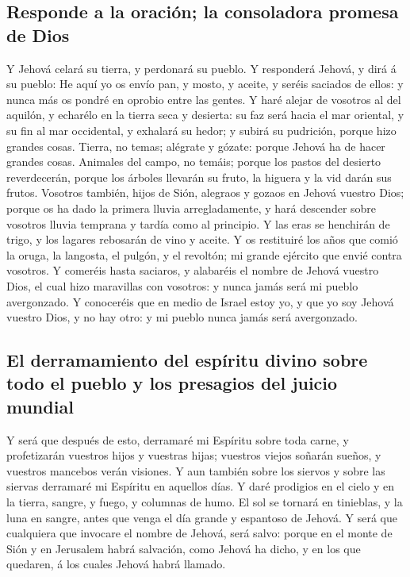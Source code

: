 \hypertarget{responde-a-la-oraciuxf3n-la-consoladora-promesa-de-dios}{%
\subsection{Responde a la oración; la consoladora promesa de
Dios}\label{responde-a-la-oraciuxf3n-la-consoladora-promesa-de-dios}}

 Y Jehová celará su tierra, y perdonará su pueblo.
 Y responderá Jehová, y dirá á su pueblo: He aquí yo os
envío pan, y mosto, y aceite, y seréis saciados de ellos: y nunca más os
pondré en oprobio entre las gentes.  Y haré alejar de
vosotros al del aquilón, y echarélo en la tierra seca y desierta: su faz
será hacia el mar oriental, y su fin al mar occidental, y exhalará su
hedor; y subirá su pudrición, porque hizo grandes cosas. 
Tierra, no temas; alégrate y gózate: porque Jehová ha de hacer grandes
cosas.  Animales del campo, no temáis; porque los pastos
del desierto reverdecerán, porque los árboles llevarán su fruto, la
higuera y la vid darán sus frutos.  Vosotros también,
hijos de Sión, alegraos y gozaos en Jehová vuestro Dios; porque os ha
dado la primera lluvia arregladamente, y hará descender sobre vosotros
lluvia temprana y tardía como al principio.  Y las eras
se henchirán de trigo, y los lagares rebosarán de vino y aceite.
 Y os restituiré los años que comió la oruga, la
langosta, el pulgón, y el revoltón; mi grande ejército que envié contra
vosotros.  Y comeréis hasta saciaros, y alabaréis el
nombre de Jehová vuestro Dios, el cual hizo maravillas con vosotros: y
nunca jamás será mi pueblo avergonzado.  Y conoceréis que
en medio de Israel estoy yo, y que yo soy Jehová vuestro Dios, y no hay
otro: y mi pueblo nunca jamás será avergonzado.

\hypertarget{el-derramamiento-del-espuxedritu-divino-sobre-todo-el-pueblo-y-los-presagios-del-juicio-mundial}{%
\subsection{El derramamiento del espíritu divino sobre todo el pueblo y
los presagios del juicio
mundial}\label{el-derramamiento-del-espuxedritu-divino-sobre-todo-el-pueblo-y-los-presagios-del-juicio-mundial}}

 Y será que después de esto, derramaré mi Espíritu sobre
toda carne, y profetizarán vuestros hijos y vuestras hijas; vuestros
viejos soñarán sueños, y vuestros mancebos verán visiones.
 Y aun también sobre los siervos y sobre las siervas
derramaré mi Espíritu en aquellos días.  Y daré prodigios
en el cielo y en la tierra, sangre, y fuego, y columnas de humo.
 El sol se tornará en tinieblas, y la luna en sangre,
antes que venga el día grande y espantoso de Jehová.  Y
será que cualquiera que invocare el nombre de Jehová, será salvo: porque
en el monte de Sión y en Jerusalem habrá salvación, como Jehová ha
dicho, y en los que quedaren, á los cuales Jehová habrá llamado.

